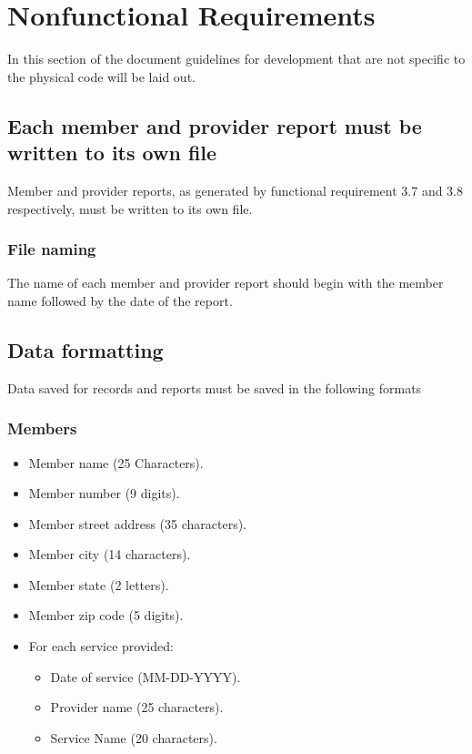 \documentclass{article}
\begin{document}
\section{Nonfunctional Requirements}
In this section of the document guidelines for development that are not specific to the physical code will be laid out. 

\subsection{Each member and provider report must be written to its own file}
Member and provider reports, as generated by functional requirement 3.7 and 3.8 respectively, must be written to its own file.

\subsubsection{File naming}
The name of each member and provider report should begin with the member name followed by the date of the report.

\subsection{Data formatting}
Data saved for records and reports must be saved in the following formats
\subsubsection{Members}
\begin{itemize}
\item Member name (25 Characters).
\item Member number (9 digits).
\item Member street address (35  characters).
\item Member city (14 characters).
\item Member state (2 letters).
\item Member zip code (5 digits).
\item For each service provided:
\begin{itemize}
\item Date of service (MM-DD-YYYY).
\item Provider name (25 characters).
\item Service Name (20 characters).
\end{itemize}
\end{itemize}
\end{document}
